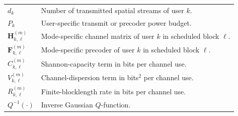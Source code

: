 \documentclass[11pt]{article}
\newcommand{\F}{\mathbf{F}}
\newcommand{\Hc}{\mathbf{H}}
\begin{document}
\begin{table}[ht]
\begin{tabularx}{\textwidth}{>{\raggedright\arraybackslash}p{} X}
$d_k$ & Number of transmitted spatial streams of user $k$. \\
$P_k$ & User-specific transmit or precoder power budget. \\
$\Hc_{k,\ell}^{(m)}$ & Mode-specific channel matrix of user $k$ in scheduled block $\ell$. \\
$\F_{k,\ell}^{(m)}$ & Mode-specific precoder of user $k$ in scheduled block $\ell$. \\
$C_{k,\ell}^{(m)}$ & Shannon-capacity term in bits per channel use. \\
$V_{k,\ell}^{(m)}$ & Channel-dispersion term in bits$^2$ per channel use. \\
$R_{k,\ell}^{(m)}$ & Finite-blocklength rate in bits per channel use. \\
$Q^{-1}(\cdot)$ & Inverse Gaussian $Q$-function. \\
\bottomrule
\end{tabularx}
\end{table}
\end{document}
